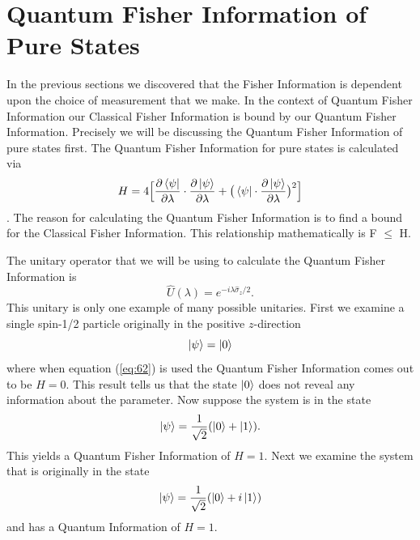 \documentclass[twocolumn]{article}
\begin{document}
\section*{Quantum Fisher Information of Pure States}
In the previous sections we discovered that the Fisher Information is dependent upon the choice of measurement that we make. In the context of Quantum Fisher Information our Classical Fisher Information is bound by our Quantum Fisher Information. Precisely we will be discussing the Quantum Fisher Information of pure states first. The Quantum Fisher Information for pure states is calculated via
\begin{equation} \label{eq:62}
H=4\Big[\frac{\partial\bra{\psi}}{\partial\lambda}\cdot\frac{\partial\ket{\psi}}{\partial\lambda}+\big(\bra{\psi}\cdot\frac{\partial\ket{\psi}}{\partial\lambda}\big)^2\Big]
\end{equation}
\cite{D. Collins}. The reason for calculating the Quantum Fisher Information is to find a bound for the Classical Fisher Information. This relationship mathematically is F $\leq$ H. 

The unitary operator that we will be using to calculate the Quantum Fisher Information is
\begin{equation} \label{eq:63}
\hat{U}(\lambda)=e^{-i\lambda\hat{\sigma}_z/2}.
\end{equation}
This unitary is only one example of many possible unitaries. First we examine a single spin-1/2 particle originally in the positive $z$-direction
\begin{equation} \label{eq:64}
\ket{\psi}=\ket{0}
\end{equation}
where when equation (\ref{eq:62}) is used the Quantum Fisher Information comes out to be $H=0$. This result tells us that the state $\ket{0}$ does not reveal any information about the parameter. Now suppose the system is in the state
\begin{equation} \label{eq:65}
\ket{\psi}=\frac{1}{\sqrt{2}}(\ket{0}+\ket{1}).
\end{equation}
This yields a Quantum Fisher Information of $H=1$. Next we examine the system that is originally in the state
\begin{equation} \label{eq:66}
\ket{\psi}=\frac{1}{\sqrt{2}}(\ket{0}+i\ket{1})
\end{equation}
and has a Quantum Information of $H=1$.
\end{document}
